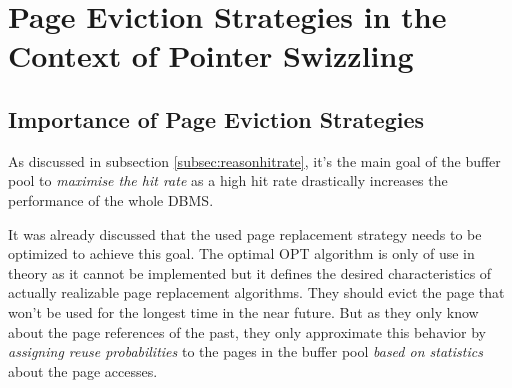 \chapter[Page Eviction Strategies]{Page Eviction Strategies in the Context of Pointer Swizzling} \label{ch:eviction}

\section{Importance of Page Eviction Strategies} \label{sec:evictionreasons}

    As discussed in subsection \ref{subsec:reasonhitrate}, it's the main goal of the buffer pool to \emph{maximise the hit rate} as a high hit rate drastically increases the performance of the whole DBMS. 

    It was already discussed that the used page replacement strategy needs to be optimized to achieve this goal. The optimal OPT algorithm is only of use in theory as it cannot be implemented but it defines the desired characteristics of actually realizable page replacement algorithms. They should evict the page that won't be used for the longest time in the near future. But as they only know about the page references of the past, they only approximate this behavior by \emph{assigning reuse probabilities} to the pages in the buffer pool \emph{based on statistics} about the page accesses.

